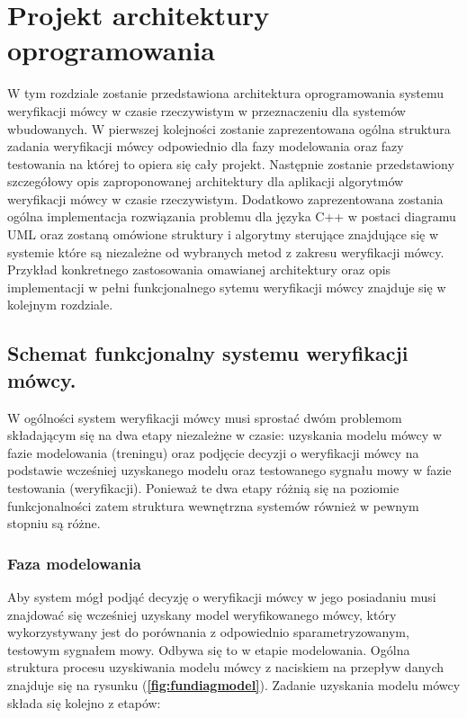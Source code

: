 \chapter{Projekt architektury oprogramowania}

W tym rozdziale zostanie przedstawiona architektura oprogramowania systemu weryfikacji mówcy w czasie rzeczywistym w przeznaczeniu dla systemów wbudowanych. W pierwszej kolejności zostanie zaprezentowana ogólna struktura zadania weryfikacji mówcy odpowiednio dla fazy modelowania oraz fazy testowania na której to opiera się cały projekt. Następnie zostanie przedstawiony szczegółowy opis zaproponowanej architektury dla aplikacji algorytmów weryfikacji mówcy w czasie rzeczywistym. Dodatkowo zaprezentowana zostania ogólna implementacja rozwiązania problemu dla języka C++ w postaci diagramu UML oraz zostaną omówione struktury i algorytmy sterujące znajdujące się w systemie które są niezależne od wybranych metod z zakresu weryfikacji mówcy. Przykład konkretnego zastosowania omawianej architektury oraz opis implementacji w pełni funkcjonalnego sytemu weryfikacji mówcy znajduje się w kolejnym rozdziale.

\section{Schemat funkcjonalny systemu weryfikacji mówcy.}

W ogólności system weryfikacji mówcy musi sprostać dwóm problemom składającym się na dwa etapy niezależne w czasie: uzyskania modelu mówcy w fazie modelowania (treningu) oraz podjęcie decyzji o weryfikacji mówcy na podstawie wcześniej uzyskanego modelu oraz testowanego sygnału mowy w fazie testowania (weryfikacji). Ponieważ te dwa etapy różnią się na poziomie funkcjonalności zatem struktura wewnętrzna systemów również w pewnym stopniu są różne.

\subsection{Faza modelowania}

Aby system mógł podjąć decyzję o weryfikacji mówcy w jego posiadaniu musi znajdować się wcześniej uzyskany model weryfikowanego mówcy, który wykorzystywany jest do porównania z odpowiednio sparametryzowanym, testowym sygnałem mowy. Odbywa się to w etapie modelowania. Ogólna struktura procesu uzyskiwania modelu mówcy z naciskiem na przepływ danych znajduje się na rysunku (\textbf{\ref{fig:fundiagmodel}}). Zadanie uzyskania modelu mówcy składa się kolejno z etapów:

